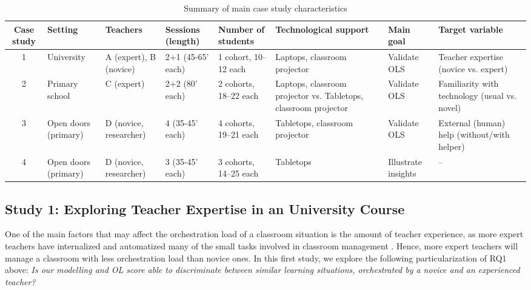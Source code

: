 \documentclass[10pt,journal,compsoc]{IEEEtran}
\begin{document}
\begin{table}[!t]
\caption{Summary of main case study characteristics}
\label{tab:cases}
\centering
\begin{tabular}{|c||p{1.5cm}|p{1.5cm}|p{1.5cm}|p{1.5cm}|p{2.7cm}|p{2cm}|p{3.4cm}|}
\hline
Case study & Setting & Teachers & Sessions (length) & Number of students & Technological support & Main goal & Target variable\\
\hline
\hline
1 & University & A (expert), B (novice) & 2+1 (45-65' each) & 1 cohort, 10--12 each & Laptops, classroom projector & Validate OLS & Teacher expertise (novice vs. expert) \\
\hline
2 & Primary school & C (expert) & 2+2 (80' each) & 2 cohorts, 18--22 each & Laptops, classroom projector vs. Tabletops, classroom projector & Validate OLS & Familiarity with technology (usual vs. novel) \\
\hline
3 & Open doors (primary) & D (novice, researcher) & 4 (35-45' each) & 4 cohorts, 19--21 each & Tabletops, classroom projector & Validate OLS & External (human) help (without/with helper) \\
\hline
4 & Open doors (primary) & D (novice, researcher) & 3 (35-45' each) & 3 cohorts, 14--25 each & Tabletops & Illustrate insights & -- \\
\hline
\end{tabular}
\end{table}



\subsection{Study 1: Exploring Teacher Expertise in an University Course}
\label{sec:study1}

One of the main factors that may affect the orchestration load of a classroom situation is the amount of teacher experience, as more expert teachers have internalized and automatized many of the small tasks involved in classroom management \cite{feldon2007cognitive}. %
Hence, more expert teachers will manage a classroom with less orchestration load than novice ones. In this first study, we explore the following particularization of RQ1 above: \textit{Is our modelling and OL score able to discriminate between similar learning situations, orchestrated by a novice and an experienced teacher?}
\end{document}
